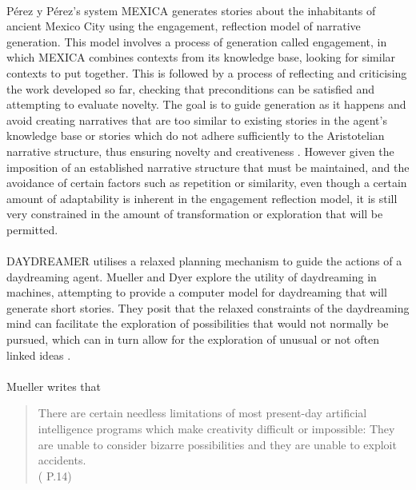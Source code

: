 \documentclass[letterpaper]{article}
\begin{document}
\\P\'erez y P\'erez's system MEXICA \cite{Perez2015} generates stories about the inhabitants of ancient Mexico City using the engagement, reflection model  of narrative generation. This model involves a process of generation called engagement, in which MEXICA combines contexts from its knowledge base, looking for similar contexts to put together. This is followed by a process of reflecting and criticising the work developed so far, checking that preconditions can be satisfied and attempting to evaluate novelty. The goal is to guide generation as it happens and avoid creating narratives that are too similar to existing stories in the agent's knowledge base or stories which do not adhere sufficiently to the Aristotelian narrative structure, thus ensuring novelty and creativeness \cite{Perez2015,PEREZYPEREZ200415}. However given the imposition of an established narrative structure that must be maintained, and the avoidance of certain factors such as repetition or similarity, even though a certain amount of adaptability is inherent in the engagement reflection model, it is still very constrained in the amount of transformation or exploration that will be permitted.\\
\\DAYDREAMER utilises a relaxed planning mechanism to guide the actions of a daydreaming agent. Mueller and Dyer explore the utility of daydreaming in machines, attempting to provide a computer model for daydreaming that will generate short stories. They posit that the relaxed constraints of the daydreaming mind can facilitate the exploration of possibilities that would not normally be pursued, which can in turn allow for the exploration of unusual or not often linked ideas \cite{Mueller1985}.\\ 
\\Mueller writes that
\begin{quote}
There are certain needless limitations of most present-day artificial intelligence programs which make creativity difficult or impossible: They are unable to consider bizarre possibilities and they are unable to exploit accidents.\\
(\citeauthor{Mueller:1990:DHM:77492} \citeyear{Mueller:1990:DHM:77492} P.14)
\end{quote}
\end{document}
